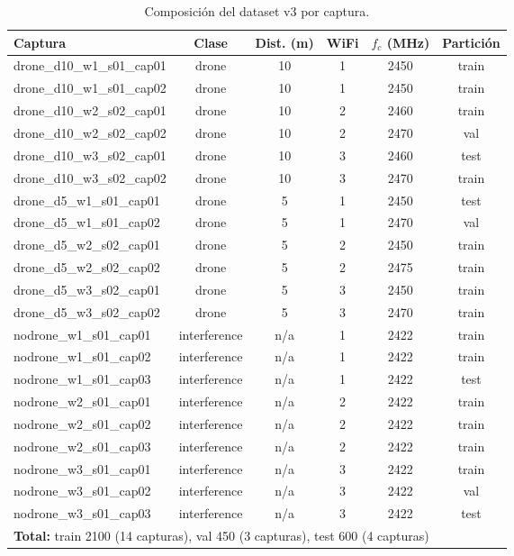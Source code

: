 \begin{table}[htbp]
\centering
\footnotesize
\caption{Composición del dataset v3 por captura.}
\label{tab:anexo_dataset_v3}
\begin{tabular}{lccccc}
\toprule
\textbf{Captura} & \textbf{Clase} & \textbf{Dist. (m)} & \textbf{WiFi} & \textbf{$f_c$ (MHz)} & \textbf{Partición} \\
\midrule
drone\_d10\_w1\_s01\_cap01 & drone & 10 & 1 & 2450 & train \\
drone\_d10\_w1\_s01\_cap02 & drone & 10 & 1 & 2450 & train \\
drone\_d10\_w2\_s02\_cap01 & drone & 10 & 2 & 2460 & train \\
drone\_d10\_w2\_s02\_cap02 & drone & 10 & 2 & 2470 & val \\
drone\_d10\_w3\_s02\_cap01 & drone & 10 & 3 & 2460 & test \\
drone\_d10\_w3\_s02\_cap02 & drone & 10 & 3 & 2470 & train \\
drone\_d5\_w1\_s01\_cap01  & drone & 5  & 1 & 2450 & test \\
drone\_d5\_w1\_s01\_cap02  & drone & 5  & 1 & 2470 & val \\
drone\_d5\_w2\_s02\_cap01  & drone & 5  & 2 & 2450 & train \\
drone\_d5\_w2\_s02\_cap02  & drone & 5  & 2 & 2475 & train \\
drone\_d5\_w3\_s02\_cap01  & drone & 5  & 3 & 2450 & train \\
drone\_d5\_w3\_s02\_cap02  & drone & 5  & 3 & 2470 & train \\
nodrone\_w1\_s01\_cap01 & interference & n/a & 1 & 2422 & train \\
nodrone\_w1\_s01\_cap02 & interference & n/a & 1 & 2422 & train \\
nodrone\_w1\_s01\_cap03 & interference & n/a & 1 & 2422 & test \\
nodrone\_w2\_s01\_cap01 & interference & n/a & 2 & 2422 & train \\
nodrone\_w2\_s01\_cap02 & interference & n/a & 2 & 2422 & train \\
nodrone\_w2\_s01\_cap03 & interference & n/a & 2 & 2422 & train \\
nodrone\_w3\_s01\_cap01 & interference & n/a & 3 & 2422 & train \\
nodrone\_w3\_s01\_cap02 & interference & n/a & 3 & 2422 & val \\
nodrone\_w3\_s01\_cap03 & interference & n/a & 3 & 2422 & test \\
\midrule
\multicolumn{6}{l}{\textbf{Total:} train \num{2100} (14 capturas), val \num{450} (3 capturas), test \num{600} (4 capturas)} \\
\bottomrule
\end{tabular}
\end{table}

